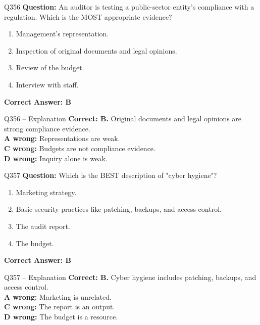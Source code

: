 \documentclass[aspectratio=169,10pt]{beamer}
\begin{document}
	\begin{frame}[t]{Q356}
		\small
		\textbf{Question:} An auditor is testing a public-sector entity's compliance with a regulation. Which is the MOST appropriate evidence?
		\begin{enumerate}[label=\Alph*.,itemsep=1pt,topsep=2pt]
			\item Management's representation.
			\item Inspection of original documents and legal opinions.
			\item Review of the budget.
			\item Interview with staff.
		\end{enumerate}
		\vspace{4pt}
		\textbf{Correct Answer: B}
	\end{frame}
	
	\begin{frame}[t]{Q356 -- Explanation}
		\small
		\textbf{Correct: B.} Original documents and legal opinions are strong compliance evidence. \\[4pt]
		\textbf{A wrong:} Representations are weak. \\[2pt]
		\textbf{C wrong:} Budgets are not compliance evidence. \\[2pt]
		\textbf{D wrong:} Inquiry alone is weak.
	\end{frame}
	
	\begin{frame}[t]{Q357}
		\small
		\textbf{Question:} Which is the BEST description of "cyber hygiene"?
		\begin{enumerate}[label=\Alph*.,itemsep=1pt,topsep=2pt]
			\item Marketing strategy.
			\item Basic security practices like patching, backups, and access control.
			\item The audit report.
			\item The budget.
		\end{enumerate}
		\vspace{4pt}
		\textbf{Correct Answer: B}
	\end{frame}
	
	\begin{frame}[t]{Q357 -- Explanation}
		\small
		\textbf{Correct: B.} Cyber hygiene includes patching, backups, and access control. \\[4pt]
		\textbf{A wrong:} Marketing is unrelated. \\[2pt]
		\textbf{C wrong:} The report is an output. \\[2pt]
		\textbf{D wrong:} The budget is a resource.
	\end{frame}
	
\end{document}
